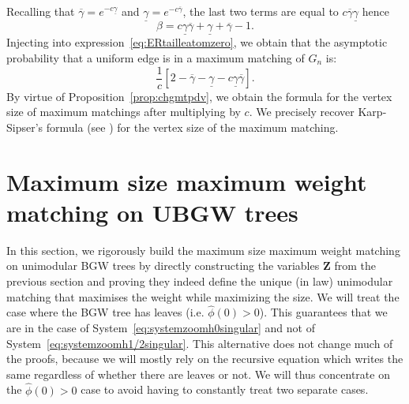 \documentclass[11pt]{article}
\begin{document}
Recalling that $\overline{\gamma}=e^{-c\underline{\gamma}}$ and $\underline{\gamma}=e^{-c\overline{\gamma}}$, the last two terms are equal to $c\overline{\gamma}\underline{\gamma}$ hence
\begin{equation}  \beta=c\underline{\gamma}\overline{\gamma}+\underline{\gamma}+\overline{\gamma}-1.
\end{equation}
Injecting into expression~\eqref{eq:ERtailleatomzero}, we obtain that the asymptotic probability that a uniform edge is in a maximum matching of $G_n$ is:
\begin{equation}
    \frac{1}{c}\left[ 2-\overline{\gamma}-\underline{\gamma} -c\underline{\gamma}\overline{\gamma}\right].
\end{equation}
By virtue of Proposition~\ref{prop:chgmtpdv}, we obtain the formula for the vertex size of maximum matchings after multiplying by $c$. We precisely recover Karp-Sipser's formula (see \cite{Karp}) for the vertex size of the maximum matching.




\section{Maximum size maximum weight matching on UBGW trees}\label{sec:infinitematching}
In this section, we rigorously build the maximum size maximum weight matching on unimodular BGW trees by directly constructing the variables $\mathbf{Z}$ from the previous section and proving they indeed define the unique (in law) unimodular matching that maximises the weight while maximizing the size.
We will treat the case where the BGW tree has leaves (i.e. $\hat{\phi}(0)>0$). This guarantees that we are in the case of System~\eqref{eq:systemzoomh0singular} and not of System~\eqref{eq:systemzoomh1/2singular}.
This alternative does not change much of the proofs, because we will mostly rely on the recursive equation which writes the same regardless of whether there are leaves or not.  We will thus concentrate on the $\hat{\phi}(0)>0$ case to avoid having to constantly treat two separate cases. 
\end{document}
